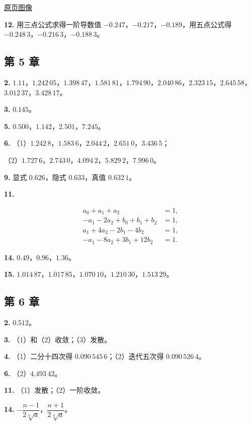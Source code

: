 \documentclass[
  10pt,
  fontset=fandol]{ctexart}
\begin{document}
\href{../../source-images/pdf-319.jpeg}{原页图像}

\textbf{12.} 用三点公式求得一阶导数值 \(-0.247\)，\(-0.217\)，\(-0.189\)，用五点公式得 \(-0.248\,3\)，\(-0.216\,3\)，\(-0.188\,3\)。

\subsection{第 5 章}\label{ux7b2c-5-ux7ae0}

\textbf{2.} \(1.11\)，\(1.242\,05\)，\(1.398\,47\)，\(1.581\,81\)，\(1.794\,90\)，\(2.040\,86\)，\(2.323\,15\)，\(2.645\,58\)，\(3.012\,37\)，\(3.428\,17\)。

\textbf{3.} \(0.145\)。

\textbf{5.} \(0.500\)，\(1.142\)，\(2.501\)，\(7.245\)。

\textbf{6.} （1）\(1.242\,8\)，\(1.583\,6\)，\(2.044\,2\)，\(2.651\,0\)，\(3.436\,5\)；

（2）\(1.727\,6\)，\(2.743\,0\)，\(4.094\,2\)，\(5.829\,2\)，\(7.996\,0\)。

\textbf{9.} 显式 \(0.626\)，隐式 \(0.633\)，真值 \(0.632\,1\)。

\textbf{11.}

\[
\begin{aligned}
a_0+a_1+a_2&=1,\\
-a_1-2a_2+b_0+b_1+b_2&=1,\\
a_1+4a_2-2b_1-4b_2&=1,\\
-a_1-8a_2+3b_1+12b_2&=1.
\end{aligned}
\]

\textbf{14.} \(0.49\)，\(0.96\)，\(1.36\)。

\textbf{15.} \(1.014\,87\)，\(1.017\,85\)，\(1.070\,10\)，\(1.210\,30\)，\(1.513\,29\)。

\subsection{第 6 章}\label{ux7b2c-6-ux7ae0}

\textbf{2.} \(0.512\)。

\textbf{3.} （1）和（2）收敛；（3）发散。

\textbf{4.} （1）二分十四次得 \(0.090\,545\,6\)；（2）迭代五次得 \(0.090\,526\,4\)。

\textbf{6.} （2）\(4.493\,42\)。

\textbf{11.} （1）发散；（2）一阶收敛。

\textbf{14.} \(-\dfrac{n-1}{2\sqrt[n]{a}}\)，\(\dfrac{n+1}{2\sqrt[n]{a}}\)。
\end{document}
